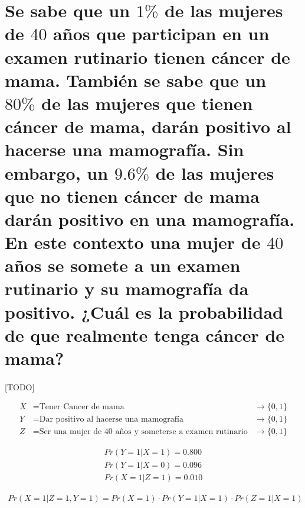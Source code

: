 \documentclass{article}
\begin{document}
	\maketitle %

	\thispagestyle{fancy} %



	\begin{abstract}
		\noindent [TODO ]
	\end{abstract}



	\section{Se sabe que un $1\%$ de las mujeres de $40$ años que participan en un examen rutinario tienen cáncer de mama. También se sabe que un $80\%$ de las mujeres que tienen cáncer de mama, darán positivo al hacerse una mamografía. Sin embargo, un $9.6\%$ de las mujeres que no tienen cáncer de mama darán positivo en una mamografía. En este contexto una mujer de $40$ años se somete a un examen rutinario y su mamografía da positivo. ¿Cuál es la probabilidad de que realmente tenga cáncer de mama?}
	\label{sec:e1}

		\paragraph{}
		[TODO]

		\begin{align}
			X &= \text{Tener Cancer de mama} 										&\rightarrow \{0,1\} \\
			Y &= \text{Dar positivo al hacerse una mamografía} 	&\rightarrow \{0,1\} \\
			Z &= \text{Ser una mujer de 40 años y someterse a examen rutinario}	&\rightarrow \{0,1\}
		\end{align}

		\begin{align}
			Pr(Y = 1 | X = 1) = 0.800 \\
			Pr(Y = 1 | X = 0) = 0.096 \\
			Pr(X = 1 | Z = 1) = 0.010
 		\end{align}

		\begin{align}
			Pr(X = 1 | Z = 1, Y = 1) = Pr(X = 1) \cdot Pr(Y = 1 | X = 1) \cdot Pr(Z = 1 | X = 1)
		\end{align}
\end{document}
